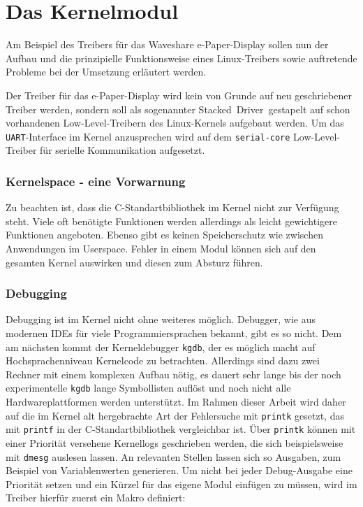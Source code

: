 
\chapter{Das Kernelmodul} 
Am Beispiel des Treibers für das Waveshare e-Paper-Display sollen nun der Aufbau und die prinzipielle Funktionsweise eines Linux-Treibers sowie auftretende Probleme bei der Umsetzung erläutert werden. 

Der Treiber für das e-Paper-Display wird kein von Grunde auf neu geschriebener Treiber werden, sondern soll als sogenannter \glqq Stacked~Driver\grqq~gestapelt auf schon vorhandenen Low-Level-Treibern des Linux-Kernels aufgebaut werden. 
Um das \texttt{UART}-Interface im Kernel anzusprechen wird auf dem \texttt{serial-core} Low-Level-Treiber für serielle Kommunikation aufgesetzt. 

\subsection{Kernelspace - eine Vorwarnung}
Zu beachten ist, dass die C-Standartbibliothek im Kernel nicht zur Verfügung steht. Viele oft benötigte Funktionen werden allerdings als leicht gewichtigere Funktionen angeboten. Ebenso gibt es keinen Speicherschutz wie zwischen Anwendungen im Userspace. Fehler in einem Modul können sich auf den gesamten Kernel auswirken und diesen zum Absturz führen. 

\subsection{Debugging}
Debugging ist im Kernel nicht ohne weiteres möglich. Debugger, wie aus modernen IDEs für viele Programmiersprachen bekannt, gibt es so nicht. Dem am nächsten kommt der Kerneldebugger \texttt{kgdb}, der es möglich macht auf Hochsprachenniveau Kernelcode zu betrachten. Allerdings sind dazu zwei Rechner mit einem komplexen Aufbau nötig, es dauert sehr lange bis der noch experimentelle \texttt{kgdb} lange Symbollisten auflöst und noch nicht alle Hardwareplattformen werden unterstützt. %
Im Rahmen dieser Arbeit wird daher auf die im Kernel alt hergebrachte Art der Fehlersuche mit \texttt{printk} gesetzt, das mit \texttt{printf} in der C-Standartbibliothek vergleichbar ist. Über \texttt{printk} können mit einer Priorität versehene Kernellogs geschrieben werden, die sich beispielsweise mit \texttt{dmesg} auslesen lassen. An relevanten Stellen lassen sich so Ausgaben, zum Beispiel von Variablenwerten generieren. Um nicht bei jeder Debug-Ausgabe eine Priorität setzen und ein Kürzel für das eigene Modul einfügen zu müssen, wird im Treiber hierfür zuerst ein Makro definiert:

